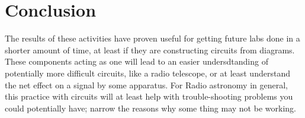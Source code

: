 \documentclass[12 pt]{article}
\begin{document}
\section{Conclusion}
The results of these activities have proven useful for getting future
labs done in a shorter amount of time, at least if they are constructing
circuits from diagrams. These components acting as one will lead to an
easier undersdtanding of potentially more difficult circuits, like a
radio telescope, or at least understand the net effect on a signal by
some apparatus. For Radio astronomy in general, this practice with
circuits will at least help with trouble-shooting problems you could
potentially have; narrow the reasons why some thing may not be working.   
\end{document}
